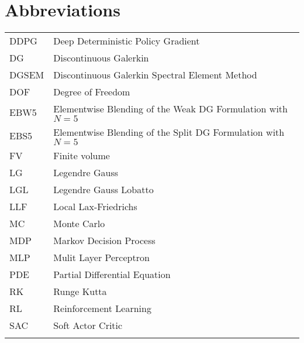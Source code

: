 \newpage
\chapter*{Abbreviations}
\begin{tabular}{ll}
  \vspace{1mm}
  DDPG     & Deep Deterministic Policy Gradient\\
  \vspace{1mm}
  DG      & Discontinuous Galerkin\\
  \vspace{1mm}
  DGSEM      & Discontinuous Galerkin Spectral Element Method \\ 
  \vspace{1mm} 
  DOF     & Degree of Freedom\\
  \vspace{1mm}
  EBW5     & Elementwise Blending of the Weak DG Formulation with $N=5$\\
  \vspace{1mm}
  EBS5     & Elementwise Blending of the Split DG Formulation with $N=5$\\
  \vspace{1mm}
  FV      & Finite volume\\
  \vspace{1mm}  
  LG      & Legendre Gauss\\  
  \vspace{1mm}
  LGL      & Legendre Gauss Lobatto\\
  \vspace{1mm}
  LLF     & Local Lax-Friedrichs\\
  \vspace{1mm}
  MC     & Monte Carlo\\
  \vspace{1mm}
  MDP     & Markov Decision Process\\
  \vspace{1mm}
  MLP     & Mulit Layer Perceptron\\
  \vspace{1mm}
  PDE      & Partial Differential Equation\\
  \vspace{1mm}
  RK     & Runge Kutta\\
  \vspace{1mm}
  RL      & Reinforcement Learning\\
  \vspace{1mm}
  SAC     & Soft Actor Critic\\  
  \vspace{1mm}

\end{tabular}
